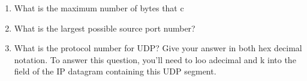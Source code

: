 \begin{enumerate}[label=\bfseries Problem \arabic*:,leftmargin=*,labelindent=1em]
        \item What is the maximum number of bytes that c\\[0.2mm]
        \soln
        \item What is the largest possible source port number?\\[0.2mm]
        \soln
        \item What is the protocol number for UDP? 
        Give your answer in both hex decimal notation. 
        To answer this question, you’ll need to loo adecimal and k into the field of the IP datagram containing this UDP segment.\\[0.2mm]
        \soln
    \end{enumerate}
\newpage